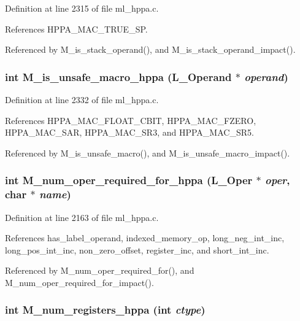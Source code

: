 Definition at line 2315 of file ml\_\-hppa.c.

References HPPA\_\-MAC\_\-TRUE\_\-SP.

Referenced by M\_\-is\_\-stack\_\-operand(), and M\_\-is\_\-stack\_\-operand\_\-impact().
\subsubsection{\setlength{\rightskip}{0pt plus 5cm}int M\_\-is\_\-unsafe\_\-macro\_\-hppa (L\_\-Operand $\ast$ {\em operand})}\label{m__hppa_8h_0f3990ca95608d8d793b81daf3eebd38}




Definition at line 2332 of file ml\_\-hppa.c.

References HPPA\_\-MAC\_\-FLOAT\_\-CBIT, HPPA\_\-MAC\_\-FZERO, HPPA\_\-MAC\_\-SAR, HPPA\_\-MAC\_\-SR3, and HPPA\_\-MAC\_\-SR5.

Referenced by M\_\-is\_\-unsafe\_\-macro(), and M\_\-is\_\-unsafe\_\-macro\_\-impact().
\subsubsection{\setlength{\rightskip}{0pt plus 5cm}int M\_\-num\_\-oper\_\-required\_\-for\_\-hppa (L\_\-Oper $\ast$ {\em oper}, char $\ast$ {\em name})}\label{m__hppa_8h_89b059fb225665f4f6772c31ed7af1d7}




Definition at line 2163 of file ml\_\-hppa.c.

References has\_\-label\_\-operand, indexed\_\-memory\_\-op, long\_\-neg\_\-int\_\-inc, long\_\-pos\_\-int\_\-inc, non\_\-zero\_\-offset, register\_\-inc, and short\_\-int\_\-inc.

Referenced by M\_\-num\_\-oper\_\-required\_\-for(), and M\_\-num\_\-oper\_\-required\_\-for\_\-impact().
\subsubsection{\setlength{\rightskip}{0pt plus 5cm}int M\_\-num\_\-registers\_\-hppa (int {\em ctype})}\label{m__hppa_8h_2877b550b4883ca3f13ebc597809593e}





